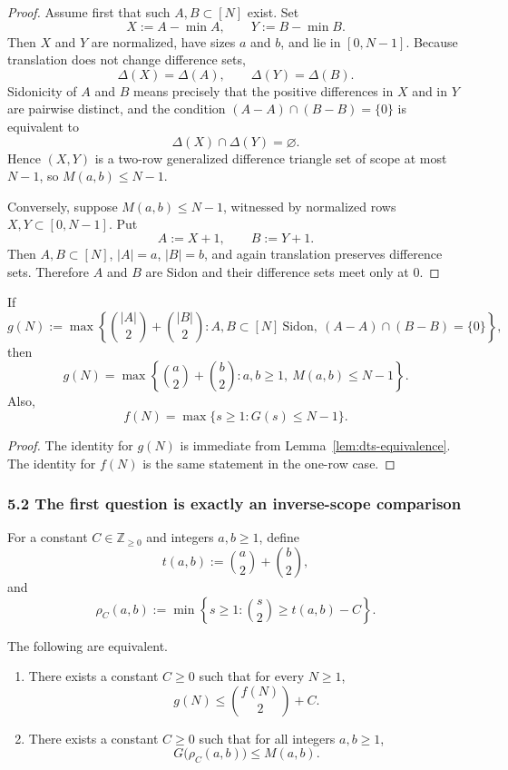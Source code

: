 \begin{proof}
Assume first that such $A,B\subset[N]$ exist. Set
\[
X:=A-\min A,\qquad Y:=B-\min B.
\]
Then $X$ and $Y$ are normalized, have sizes $a$ and $b$, and lie in $[0,N-1]$. Because translation does not change difference sets,
\[
\Delta(X)=\Delta(A),\qquad \Delta(Y)=\Delta(B).
\]
Sidonicity of $A$ and $B$ means precisely that the positive differences in $X$ and in $Y$ are pairwise distinct, and the condition $(A-A)\cap(B-B)=\{0\}$ is equivalent to
\[
\Delta(X)\cap \Delta(Y)=\varnothing.
\]
Hence $(X,Y)$ is a two-row generalized difference triangle set of scope at most $N-1$, so $M(a,b)\le N-1$.

Conversely, suppose $M(a,b)\le N-1$, witnessed by normalized rows $X,Y\subset[0,N-1]$. Put
\[
A:=X+1,\qquad B:=Y+1.
\]
Then $A,B\subset[N]$, $|A|=a$, $|B|=b$, and again translation preserves difference sets. Therefore $A$ and $B$ are Sidon and their difference sets meet only at $0$.
\end{proof}

\begin{corollary}
\label{cor:gN}
If
\[
g(N):=\max\left\{\binom{|A|}{2}+\binom{|B|}{2}: A,B\subset[N]\ \text{Sidon},\ (A-A)\cap(B-B)=\{0\}\right\},
\]
then
\[
g(N)=\max\left\{\binom{a}{2}+\binom{b}{2}: a,b\ge 1,\ M(a,b)\le N-1\right\}.
\]
Also,
\[
f(N)=\max\{s\ge 1:G(s)\le N-1\}.
\]
\end{corollary}

\begin{proof}
The identity for $g(N)$ is immediate from Lemma~\ref{lem:dts-equivalence}. The identity for $f(N)$ is the same statement in the one-row case.
\end{proof}

\subsubsection{5.2 The first question is exactly an inverse-scope comparison}

For a constant $C\in \mathbb Z_{\ge 0}$ and integers $a,b\ge 1$, define
\[
t(a,b):=\binom{a}{2}+\binom{b}{2},
\]
and
\[
\rho_C(a,b):=\min\left\{s\ge 1:\binom{s}{2}\ge t(a,b)-C\right\}.
\]

\begin{theorem}
\label{thm:exact-reformulation}
The following are equivalent.
\begin{enumerate}
\item There exists a constant $C\ge 0$ such that for every $N\ge 1$,
\[
g(N)\le \binom{f(N)}{2}+C.
\]
\item There exists a constant $C\ge 0$ such that for all integers $a,b\ge 1$,
\[
G\bigl(\rho_C(a,b)\bigr)\le M(a,b).
\]
\end{enumerate}
\end{theorem}

